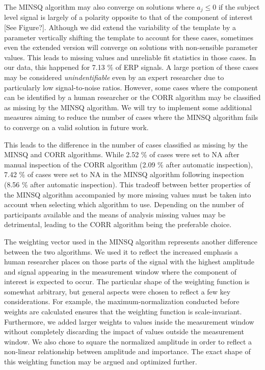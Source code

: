 \documentclass[
  man,floatsintext]{apa7}
\begin{document}
The MINSQ algorithm may also converge on solutions where \(a_j \le 0\) if the subject level signal is largely of a polarity opposite to that of the component of interest {[}See Figure?{]}. Although we did extend the variability of the template by a parameter vertically shifting the template to account for these cases, sometimes even the extended version will converge on solutions with non-sensible parameter values. This leads to missing values and unreliable fit statistics in those cases. In our data, this happened for 7.13 \% of ERP signals. A large portion of these cases may be considered \emph{unindentifiable} even by an expert researcher due to particularly low signal-to-noise ratios. However, some cases where the component can be identified by a human researcher or the CORR algorithm may be classified as missing by the MINSQ algorithm. We will try to implement some additional measures aiming to reduce the number of cases where the MINSQ algorithm fails to converge on a valid solution in future work.

This leads to the difference in the number of cases classified as missing by the MINSQ and CORR algorithms. While 2.52 \% of cases were set to NA after manual inspection of the CORR algorithm (2.09 \% after automatic inspection), 7.42 \% of cases were set to NA in the MINSQ algorithm following inspection (8.56 \% after automatic inspection). This tradeoff between better properties of the MINSQ algorithm accompanied by more missing values must be taken into account when selecting which algorithm to use. Depending on the number of participants available and the means of analysis missing values may be detrimental, leading to the CORR algorithm being the preferable choice.

The weighting vector used in the MINSQ algorithm represents another difference between the two algorithms. We used it to reflect the increased emphasis a human researcher places on those parts of the signal with the highest amplitude and signal appearing in the measurement window where the component of interest is expected to occur. The particular shape of the weighting function is somewhat arbitrary, but general aspects were chosen to reflect a few key considerations. For example, the maximum-normalization conducted before weights are calculated ensures that the weighting function is scale-invariant. Furthermore, we added larger weights to values inside the measurement window without completely discarding the impact of values outside the measurement window. We also chose to square the normalized amplitude in order to reflect a non-linear relationship between amplitude and importance. The exact shape of this weighting function may be argued and optimized further.
\end{document}

